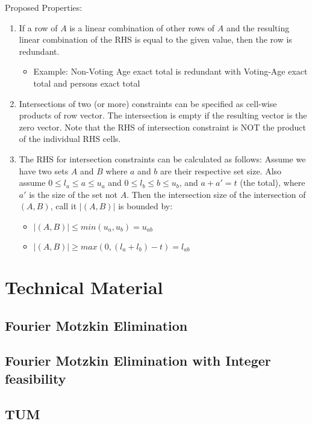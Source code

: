 \documentclass[12pt]{amsart}
\newcommand{\noi}{\noindent}
\begin{document}
\noi Proposed Properties:
\begin{enumerate}
\item If a row of $A$ is a linear combination of other rows of $A$ and the resulting linear combination of the RHS is equal to the given value, then the row is redundant.
	\begin{itemize}
	\item Example: Non-Voting Age exact total is redundant with Voting-Age exact total and persons exact total
	\end{itemize} 
\item Intersections of two (or more) constraints can be specified as cell-wise products of row vector.  The intersection is empty if the resulting vector is the zero vector. Note that the RHS of intersection constraint is NOT the product of the individual RHS cells.
\item The RHS for intersection constraints can be calculated as follows:
Assume we have two sets $A$ and $B$ where $a$ and $b$ are their respective set size.  Also assume $0 \le l_a \le a \le u_a$ and $0 \le l_b \le b \le u_b$, and $a + a' =t$ (the total), where $a'$ is the size of the set not $A$.  Then the intersection size of the intersection of $(A,B)$, call it $|(A,B)|$ is bounded by:
	\begin{itemize}
	\item $|(A,B)| \le  min(u_a, u_b)  = u_{ab} $
	\item $|(A,B)| \ge  max (0, (l_a + l_b) - t  ) = l_{ab} $
	\end{itemize} 
 
\end{enumerate}




\section{Technical Material}
\subsection{Fourier Motzkin Elimination}
\subsection{Fourier Motzkin Elimination with Integer feasibility}
\subsection{TUM}
\end{document}
